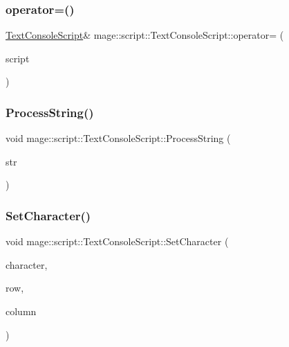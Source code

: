 \subsubsection{\texorpdfstring{operator=()}{operator=()}\hspace{0.1cm}{\footnotesize\ttfamily [2/2]}}
{\footnotesize\ttfamily \hyperlink{classmage_1_1script_1_1_text_console_script}{Text\+Console\+Script}\& mage\+::script\+::\+Text\+Console\+Script\+::operator= (\begin{DoxyParamCaption}\item[{\hyperlink{classmage_1_1script_1_1_text_console_script}{Text\+Console\+Script} \&\&}]{script }\end{DoxyParamCaption})\hspace{0.3cm}{\ttfamily [delete]}}

\hypertarget{classmage_1_1script_1_1_text_console_script_a29334fd8aa8de09b2f28c24096347498}{}\label{classmage_1_1script_1_1_text_console_script_a29334fd8aa8de09b2f28c24096347498} 
\subsubsection{\texorpdfstring{Process\+String()}{ProcessString()}}
{\footnotesize\ttfamily void mage\+::script\+::\+Text\+Console\+Script\+::\+Process\+String (\begin{DoxyParamCaption}\item[{const wchar\+\_\+t $\ast$}]{str }\end{DoxyParamCaption})\hspace{0.3cm}{\ttfamily [private]}}

\hypertarget{classmage_1_1script_1_1_text_console_script_a18bdee79ee6f53e28f90b607c36c8188}{}\label{classmage_1_1script_1_1_text_console_script_a18bdee79ee6f53e28f90b607c36c8188} 
\subsubsection{\texorpdfstring{Set\+Character()}{SetCharacter()}}
{\footnotesize\ttfamily void mage\+::script\+::\+Text\+Console\+Script\+::\+Set\+Character (\begin{DoxyParamCaption}\item[{wchar\+\_\+t}]{character,  }\item[{\hyperlink{namespacemage_a41c104c036fba3756a74e19f793eeaa1}{U32}}]{row,  }\item[{\hyperlink{namespacemage_a41c104c036fba3756a74e19f793eeaa1}{U32}}]{column }\end{DoxyParamCaption})\hspace{0.3cm}{\ttfamily [private]}}

